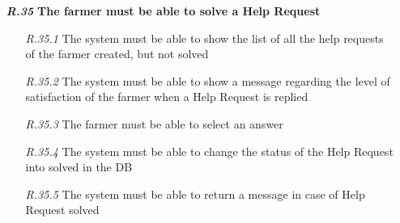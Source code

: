 \begin{itemize}
        \item [\textbf{\textit{R.35}}] \textbf{The farmer must be able to solve a Help Request}
        \begin{itemize}
            \item [\textit{R.35.1}] The system must be able to show the list of all the help requests of the farmer created, but not solved
	        \item [\textit{R.35.2}] The system must be able to show a message regarding the level of satisfaction of the farmer when a Help Request is replied
	        \item [\textit{R.35.3}] The farmer must be able to select an answer
	        \item [\textit{R.35.4}] The system must be able to change the status of the Help Request into solved in the DB
	        \item [\textit{R.35.5}] The system must be able to return a message in case of Help Request solved
        \end{itemize}




\end{itemize}
